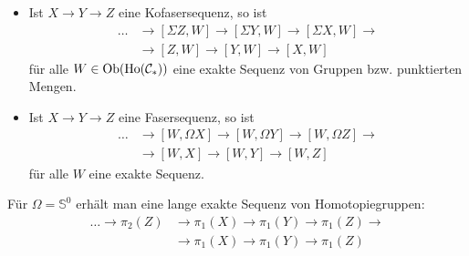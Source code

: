 \documentclass{cheat-sheet}
\DeclareMathOperator{\Ho}{Ho} %
\newcommand{\Sph}{\mathds{S}} %
\begin{document}
\begin{satz}
  \begin{itemize}
    \item Ist $X \to Y \to Z$ eine Kofasersequenz, so ist
    \begin{align*}
      \ldots & \to [\Sigma Z, W] \to [\Sigma Y, W] \to [\Sigma X, W] \to \\
      & \to [Z, W] \to [Y, W] \to [X, W]
    \end{align*}
    für alle $W \in \Ob(\Ho(\Cat_*))$ eine exakte Sequenz von Gruppen bzw. punktierten Mengen.
    \item Ist $X \to Y \to Z$ eine Fasersequenz, so ist
    \begin{align*}
      \ldots & \to [W, \Omega X] \to [W, \Omega Y] \to [W, \Omega Z] \to \\
      & \to [W, X] \to [W, Y] \to [W, Z]
    \end{align*}
    für alle $W$ eine exakte Sequenz.
  \end{itemize}
\end{satz}

\begin{bem}
  Für $\Omega = \Sph^0$ erhält man eine lange exakte Sequenz von Homotopiegruppen:
  \begin{align*}
    \ldots \to \pi_2(Z) & \to \pi_1(X) \to \pi_1(Y) \to \pi_1(Z) \to \\
    & \to \pi_1(X) \to \pi_1(Y) \to \pi_1(Z)
  \end{align*}
\end{bem}


\pagebreak

\end{document}
